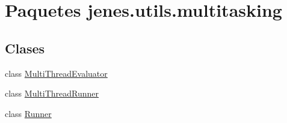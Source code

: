 \hypertarget{namespacejenes_1_1utils_1_1multitasking}{\section{Paquetes jenes.\-utils.\-multitasking}
\label{namespacejenes_1_1utils_1_1multitasking}
}
\subsection*{Clases}
\begin{DoxyCompactItemize}
\item 
class \hyperlink{classjenes_1_1utils_1_1multitasking_1_1_multi_thread_evaluator}{Multi\-Thread\-Evaluator}
\item 
class \hyperlink{classjenes_1_1utils_1_1multitasking_1_1_multi_thread_runner}{Multi\-Thread\-Runner}
\item 
class \hyperlink{classjenes_1_1utils_1_1multitasking_1_1_runner}{Runner}
\end{DoxyCompactItemize}
